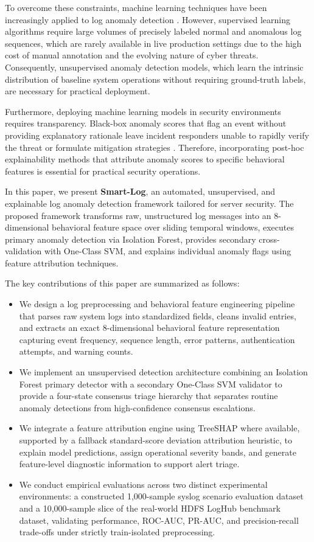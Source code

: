 \documentclass[10pt,conference]{IEEEtran}
\begin{document}
To overcome these constraints, machine learning techniques have been increasingly applied to log anomaly detection \cite{b6, b16}. However, supervised learning algorithms require large volumes of precisely labeled normal and anomalous log sequences, which are rarely available in live production settings due to the high cost of manual annotation and the evolving nature of cyber threats. Consequently, unsupervised anomaly detection models, which learn the intrinsic distribution of baseline system operations without requiring ground-truth labels, are necessary for practical deployment.

Furthermore, deploying machine learning models in security environments requires transparency. Black-box anomaly scores that flag an event without providing explanatory rationale leave incident responders unable to rapidly verify the threat or formulate mitigation strategies \cite{b6, b8}. Therefore, incorporating post-hoc explainability methods that attribute anomaly scores to specific behavioral features is essential for practical security operations.

In this paper, we present \textbf{Smart-Log}, an automated, unsupervised, and explainable log anomaly detection framework tailored for server security. The proposed framework transforms raw, unstructured log messages into an 8-dimensional behavioral feature space over sliding temporal windows, executes primary anomaly detection via Isolation Forest, provides secondary cross-validation with One-Class SVM, and explains individual anomaly flags using feature attribution techniques.

The key contributions of this paper are summarized as follows:
\begin{itemize}
\item We design a log preprocessing and behavioral feature engineering pipeline that parses raw system logs into standardized fields, cleans invalid entries, and extracts an exact 8-dimensional behavioral feature representation capturing event frequency, sequence length, error patterns, authentication attempts, and warning counts.
\item We implement an unsupervised detection architecture combining an Isolation Forest primary detector with a secondary One-Class SVM validator to provide a four-state consensus triage hierarchy that separates routine anomaly detections from high-confidence consensus escalations.
\item We integrate a feature attribution engine using TreeSHAP where available, supported by a fallback standard-score deviation attribution heuristic, to explain model predictions, assign operational severity bands, and generate feature-level diagnostic information to support alert triage.
\item We conduct empirical evaluations across two distinct experimental environments: a constructed 1,000-sample syslog scenario evaluation dataset and a 10,000-sample slice of the real-world HDFS LogHub benchmark dataset, validating performance, ROC-AUC, PR-AUC, and precision-recall trade-offs under strictly train-isolated preprocessing.
\end{itemize}
\end{document}
